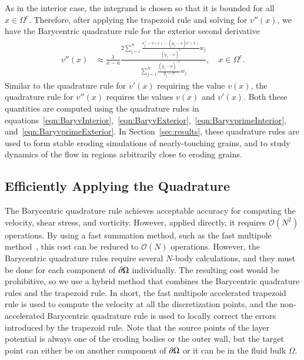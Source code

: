 \documentclass[preprint,10pt]{elsarticle}
\begin{document}
As in the interior case, the integrand is chosen so that it is bounded
for all $x \in \Omega^c$.  Therefore, after applying the trapezoid rule
and solving for $v''(x)$, we have the Barycentric quadrature rule for
the exterior second derivative
\begin{align}
  v''(x) &\approx \frac{1}{x-a}\frac{2\sum\limits_{j=1}^N
    \frac{v^{+}_{j} - v(x) - (y_j-x)v'(x)}{(y_j-x)^3}w_j}
    {\sum\limits_{j=1}^N \frac{(y_j-a)^{-1}}{y_j-x}w_j}, 
    \quad x \in \Omega^c.
\end{align}
Similar to the quadrature rule for $v'(x)$ requiring the value $v(x)$,
the quadrature rule for $v''(x)$ requires the values $v(x)$ and $v'(x)$.
Both these quantities are computed using the quadrature rules in
equations~\eqref{eqn:BaryvInterior},~\eqref{eqn:BaryvExterior},~\eqref{eqn:BaryvprimeInterior},
and~\eqref{eqn:BaryvprimeExterior}. In Section~\ref{sec:results}, these
quadrature rules are used to form stable eroding simulations of
nearly-touching grains, and to study dynamics of the flow in regions
arbitrarily close to eroding grains.

\subsection{Efficiently Applying the Quadrature}
\label{sec:fmm}
The Barycentric quadrature rule achieves acceptable accuracy for
computing the velocity, shear stress, and vorticity.  However, applied
directly, it requires $\mathcal{O}(N^2)$ operations.  By using a fast
summation method, such as the fast multipole method~\cite{gre-rok1987},
this cost can be reduced to $\mathcal{O}(N)$ operations.  However, the
Barycentric quadrature rules require several $N$-body calculations, and
they must be done for each component of ${\partial}\Omega$ individually.  The
resulting cost would be prohibitive, so we use a hybrid method that
combines the Barycentric quadrature rules and the trapezoid rule.  In
short, the fast multipole accelerated trapezoid rule is used to compute
the velocity at all the discretization points, and the non-accelerated
Barycentric quadrature rule is used to locally correct the errors
introduced by the trapezoid rule.  Note that the source points of the
layer potential is always one of the eroding bodies or the outer wall,
but the target point can either be on another component of ${\partial}\Omega$
or it can be in the fluid bulk $\Omega$.
\end{document}
